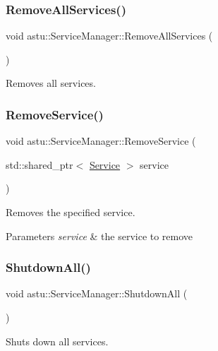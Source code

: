 \subsubsection{\texorpdfstring{Remove\+All\+Services()}{RemoveAllServices()}}
{\footnotesize\ttfamily void astu\+::\+Service\+Manager\+::\+Remove\+All\+Services (\begin{DoxyParamCaption}{ }\end{DoxyParamCaption})}

Removes all services. \mbox{\label{classastu_1_1ServiceManager_adbab5f4a6e042604e2c51eefcf69f7b5}} 
\subsubsection{\texorpdfstring{Remove\+Service()}{RemoveService()}}
{\footnotesize\ttfamily void astu\+::\+Service\+Manager\+::\+Remove\+Service (\begin{DoxyParamCaption}\item[{std\+::shared\+\_\+ptr$<$ \hyperlink{classastu_1_1Service}{Service} $>$}]{service }\end{DoxyParamCaption})}

Removes the specified service.


\begin{DoxyParams}{Parameters}
{\em service} & the service to remove \\
\hline
\end{DoxyParams}
\mbox{\label{classastu_1_1ServiceManager_a0ec3c06392ae4e7dab8d4b550bed1699}} 
\subsubsection{\texorpdfstring{Shutdown\+All()}{ShutdownAll()}}
{\footnotesize\ttfamily void astu\+::\+Service\+Manager\+::\+Shutdown\+All (\begin{DoxyParamCaption}{ }\end{DoxyParamCaption})}

Shuts down all services. \mbox{\label{classastu_1_1ServiceManager_a7d4918c435a26a4212902ade5f9829b6}} 
